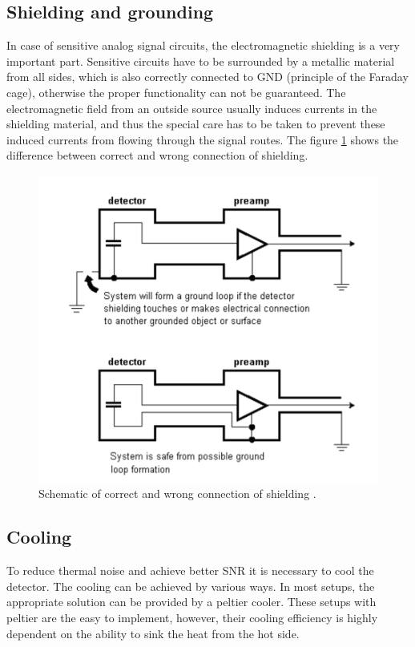 \subsection{Shielding and grounding}

In case of sensitive analog signal circuits, the electromagnetic shielding is a very important part. Sensitive circuits have to be surrounded by a metallic material from all sides, which is also correctly connected to GND (principle of the Faraday cage), otherwise the proper functionality can not be guaranteed. The electromagnetic field from an outside source usually induces currents in the shielding material, and thus the special care has to be taken to prevent these induced currents from flowing through the signal routes. The figure \ref{shielding} shows the difference between correct and wrong connection of shielding.

\begin{figure}[H]
 \centering
 \includegraphics[scale=0.35, angle = 0]{./pictures/shielding.png}
 \caption{Schematic of correct and wrong connection of shielding \cite{appCSPnote}.}
 \label{shielding}
 
\end{figure}



\subsection{Cooling}
To reduce thermal noise and achieve better SNR it is necessary to cool the detector. The cooling can be achieved by various ways. In most setups, the appropriate solution can be provided by a peltier cooler. These setups with peltier are the easy to implement, however, their cooling efficiency is highly dependent on the ability to sink the heat from the hot side.

